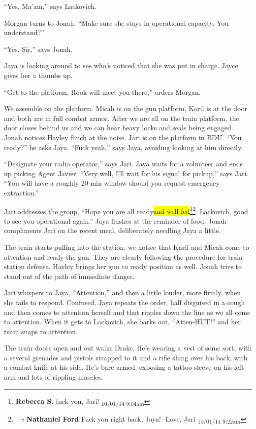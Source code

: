 ``Yes, Ma'am,'' says Lackovich.

Morgan turns to Jonah.  ``Make sure she stays in operational capacity.  You understand?''

``Yes, Sir,'' says Jonah.

Jaya is looking around to see who's noticed that she was put in charge.  Jayce gives her a thumbs up.

``Get to the platform, Rook will meet you there,'' orders Morgan.



We assemble on the platform.  Micah is on the gun platform, Karil is at the door and both are in full combat armor.  After we are all on the train platform, the door closes behind us and we can hear heavy locks and seals being engaged. Jonah notices Hayley flinch at the noise.  Jari is on the platform in BDU.  ``You ready?'' he asks Jaya.  ``Fuck yeah,'' says Jaya, avoiding looking at him directly.

``Designate your radio operator,'' says Jari.  Jaya waits for a volunteer and ends up picking Agent Javier.   ``Very well, I'll wait for his signal for pickup,'' says Jari.  ``You will have a roughly 20 min window should you request emergency extraction.''

Jari addresses the group, ``Hope you are all ready\hl{and well fed}\footnote{\textbf{Rebecca S. }fuck you, Jari! \textsubscript{10/01/14 9:04am}}\footnote{$\rightarrow$\textbf{Nathaniel Ford }Fuck you right back, Jaya! -Love, Jari \textsubscript{10/01/14 9:22am}}.  Lackovich, good to see you operational again.''  Jaya flushes at the reminder of food.  Jonah compliments Jari on the recent meal, deliberately needling Jaya a little.

The train starts pulling into the station, we notice that Karil and Micah come to attention and ready the gun. They are clearly following the procedure for train station defense.  Hayley brings her gun to ready position as well.  Jonah tries to stand out of the path of immediate danger.

Jari whispers to Jaya, ``Attention,'' and then a little louder, more firmly, when she fails to respond.  Confused, Jaya repeats the order, half disguised in a cough and then comes to attention herself and that ripples down the line as we all come to attention.  When it gets to Lackovich, she barks out, ``Atten-HUT!'' and her team snaps to attention.



The train doors open and out walks Drake.  He's wearing a vest of some sort, with a several grenades and pistols strapped to it and a rifle slung over his back, with a combat knife at his side.  He's bare armed, exposing a tattoo sleeve on his left arm and lots of rippling muscles.




